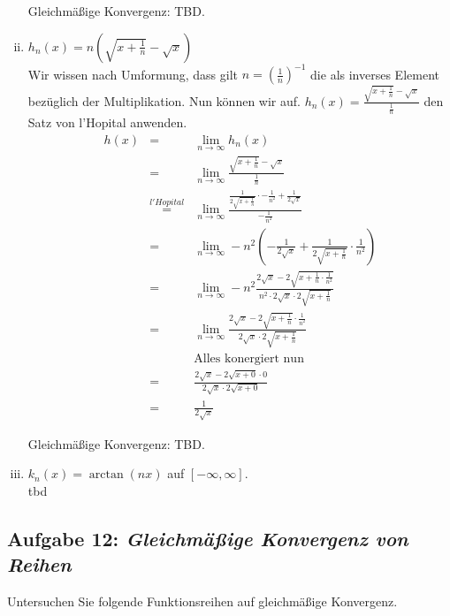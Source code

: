 \documentclass[11pt,a4paper,ngerman]{article}
\newcommand{\limes}[2][n]{\underset{ #1 \rightarrow #2}{\lim}}
\begin{document}
\begin{enumerate}[(i)]
        Gleichmäßige Konvergenz: TBD.

    \item $h_n(x) = n\left( \sqrt{x + \frac{1}{n}} - \sqrt{x} \right)$\\
        Wir wissen nach Umformung, dass gilt $n = \left(\frac{1}{n} \right)^{-1}$ die
        als inverses Element bezüglich der Multiplikation.
        Nun können wir auf.
        $h_n(x) = \frac{\sqrt{x + \frac{1}{n}} - \sqrt{x}}{\frac{1}{n}}$ den Satz von l'Hopital
        anwenden.
        $$\begin{array}{rcl}
            h(x) &=& \limes{\infty} h_n(x)\\
                &=& \limes{\infty} \frac{\sqrt{x + \frac{1}{n}} - \sqrt{x}}{\frac{1}{n}}\\
                &\stackrel{l'Hopital}{=}& 
                    \limes{\infty} \frac{\frac{1}{2\sqrt{x+\frac{1}{n}}}\cdot-\frac{1}{n^2} 
                    + \frac{1}{2\sqrt{x}}}{-\frac{1}{n^2}}\\
                &=& \limes{\infty} -n^2 \left( - \frac{1}{2\sqrt{x}} 
                    + \frac{1}{2\sqrt{x+\frac{1}{n}}} \cdot \frac{1}{n^2}\right)\\
                &=& \limes{\infty} -n^2 \frac{2\sqrt{x} - 2\sqrt{x+\frac{1}{n} \cdot \frac{1}{n^2}}}
                    {n^2 \cdot 2\sqrt{x} \cdot 2\sqrt{x + \frac{1}{n}}}\\
                &=& \limes{\infty} \frac{2\sqrt{x} - 2\sqrt{x+\frac{1}{n}} \cdot \frac{1}{n^2}}
                    {2\sqrt{x} \cdot 2\sqrt{x + \frac{1}{n}}}\\
                && \text{Alles konergiert nun}\\
                &=& \frac{2\sqrt{x} - 2\sqrt{x+0} \cdot 0}{2\sqrt{x} \cdot 2\sqrt{x+0}}\\
                &=& \frac{1}{2\sqrt{x}}
        \end{array}$$ 
         
        Gleichmäßige Konvergenz: TBD.
    \item $k_n(x) = \arctan(nx)$ auf $[-\infty, \infty]$.\\
        tbd
\end{enumerate}

\subsection*{Aufgabe 12: \mdseries\itshape Gleichmäßige Konvergenz von Reihen}

Untersuchen Sie folgende Funktionsreihen auf gleichmäßige Konvergenz.
\end{document}
